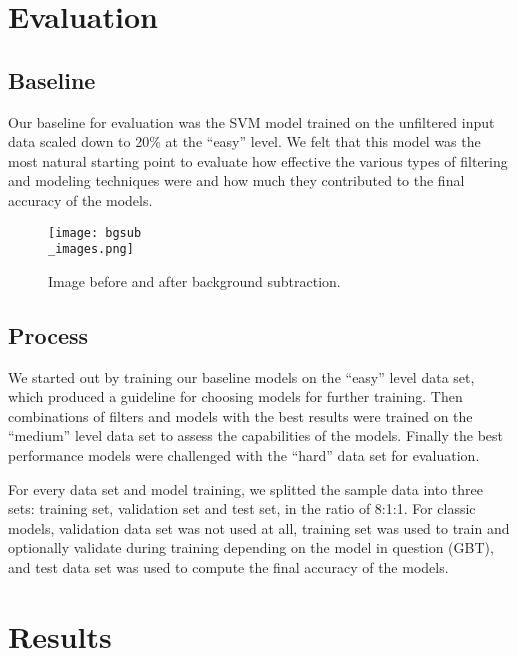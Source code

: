 \documentclass[
	a4paper, %
	10pt, %
	unnumberedsections, %
	twoside, %
]{t0004}
\begin{document}
\section{Evaluation}

\subsection{Baseline}

Our baseline for evaluation was the SVM model trained on the unfiltered input data scaled down to 20\% at the ``easy'' level. We felt that this model was the most natural starting point to evaluate how effective the various types of filtering and modeling techniques were and how much they contributed to the final accuracy of the models.

\begin{figure}
	\texttt{[image: bgsub\\\_images.png]}
	\caption{Image before and after background subtraction.}
	\label{fig:bgimages}
\end{figure}

\subsection{Process}

We started out by training our baseline models on the ``easy'' level data set, which produced a guideline for choosing models for further training. Then combinations of filters and models with the best results were trained on the ``medium'' level data set to assess the capabilities of the models. Finally the best performance models were challenged with the ``hard'' data set for evaluation.

For every data set and model training, we splitted the sample data into three sets: training set, validation set and test set, in the ratio of 8:1:1. For classic models, validation data set was not used at all, training set was used to train and optionally validate during training depending on the model in question (GBT), and test data set was used to compute the final accuracy of the models.

\section{Results}
\end{document}
